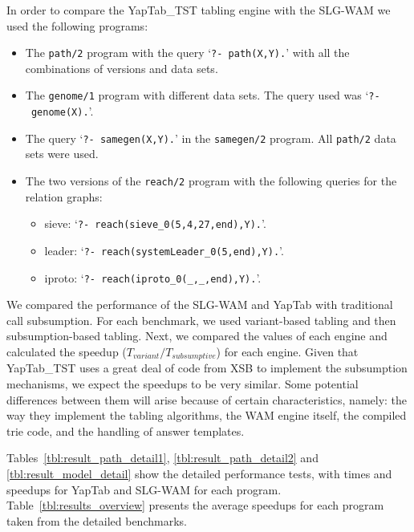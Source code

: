 In order to compare the YapTab\_TST tabling engine with the SLG-WAM we used the following programs:

\begin{itemize}
   \item The \texttt{path/2} program with the query `\texttt{?-~path(X,Y).}' with all the combinations of
   versions and data sets.
   \item The \texttt{genome/1} program with different data sets. The query used was `\texttt{?-~genome(X).}'.
   
   \item The query `\texttt{?-~samegen(X,Y).}' in the \texttt{samegen/2} program. All \texttt{path/2} data
   sets were used.
   
   \item The two versions of the \texttt{reach/2} program with the following queries for the relation graphs:

   \begin{itemize}
      \item sieve: `\texttt{?-~reach(sieve\_0(5,4,27,end),Y).}'.
      \item leader: `\texttt{?-~reach(systemLeader\_0(5,end),Y).}'.
      \item iproto: `\texttt{?-~reach(iproto\_0(\_,\_,end),Y).}'.
   \end{itemize}

\end{itemize}

We compared the performance of the SLG-WAM and YapTab with traditional call subsumption.
For each benchmark, we used variant-based tabling and then subsumption-based tabling.
Next, we compared the values of each engine and calculated the speedup ($T_{variant} / T_{subsumptive}$) for
each engine. Given that YapTab\_TST uses a great deal of code from XSB to implement the subsumption mechanisms,
we expect the speedups to be very similar. Some potential differences between them will arise because
of certain characteristics, namely: the way they implement the tabling algorithms, the WAM engine itself,
the compiled trie code, and the handling of answer templates.

Tables~\ref{tbl:result_path_detail1}, \ref{tbl:result_path_detail2} and \ref{tbl:result_model_detail}
show the detailed performance tests, with times and speedups for YapTab and SLG-WAM for each program.
Table~\ref{tbl:results_overview} presents the average speedups for each program taken from the
detailed benchmarks.

